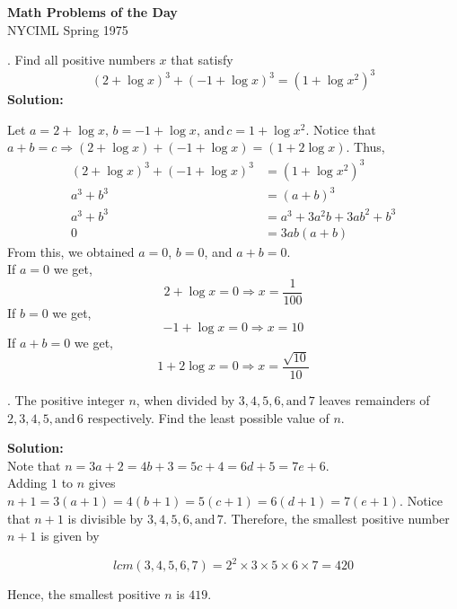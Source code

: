 \documentclass[12pt]{article}
\begin{document}
	\setlength{\columnsep}{20pt}
	\renewcommand{\arraystretch}{1.5}
	\singlespacing
	
	\noindent
	\begin{center}
	{\large  \textbf{Math Problems of the Day}} \\ 
 	NYCIML Spring 1975
	\end{center}

	. Find all positive numbers $x$ that satisfy
	\[ {\left( 2 + \log x \right)}^3 + {\left( -1 + \log x \right)}^3 = {\left( 1 + \log x^2 \right)}^3 \]
	\bigskip
	\noindent
	\textbf{Solution:}
	
	\noindent
	Let $ a = 2 + \log x , \, b = -1 + \log x  , \, \text{and} \, c = 1 + \log x^2  $. Notice that $ a + b = c \Rightarrow \left( 2 + \log x \right) + \left( -1 + \log x \right) =\left( 1 + 2 \log x \right)  $. Thus,
		\begin{align*}
				{\left( 2 + \log x \right)}^3 + {\left( -1 + \log x \right)}^3 & = {\left( 1 + \log x^2 \right)}^3 \\
				a^3 + b^3 & = {(a+b)}^3 \\
				a^3 + b^3 & = a^3 + 3a^2b + 3ab^2 + b^3 \\
				0 & = 3ab \left( a+b \right)
		\end{align*}
	\medskip
		From this, we obtained $a = 0$,  $b = 0 $, and $ a+b = 0 $. \\
		If $ a = 0 $ we get,
		\[ 2 + \log x = 0 \Rightarrow x = \frac{1}{100}  \]
		If $ b = 0 $ we get,
		\[ -1 + \log x = 0 \Rightarrow {x = 10} \]
		If $ a + b = 0 $ we get,
		\[ 1 + 2 \log x = 0 \Rightarrow x = \frac{\sqrt{10}}{10}  \]
	
	\bigskip
	. The positive integer $n$, when divided by \( 3, 4, 5, 6, \text{and} \, 7 \) leaves remainders of \(2, 3, 4, 5, \text{and} \, 6  \) respectively. Find the least possible value of $n$.
	
	\bigskip
	\noindent
	\textbf{Solution:} \\
	
	
	\noindent 
	Note that $n = 3a+2 = 4b+3 = 5c+4 = 6d+5 = 7e+6$. \\
	
	\noindent
	Adding $1$ to $n$ gives $n+1 = 3(a+1) = 4(b+1) = 5(c+1) = 6(d+1) = 7(e+1)$. Notice that $n+1$ is divisible by $3, 4, 5, 6, \text{and} \, 7 $. Therefore, the smallest positive number $n+1$ is given by 
	
	 \[ lcm(3, 4, 5, 6, 7) = 2^2 \times 3 \times 5 \times 6 \times 7 = 420   \]
	
	\noindent
	Hence, the smallest positive $n$ is $419$.
\end{document}
